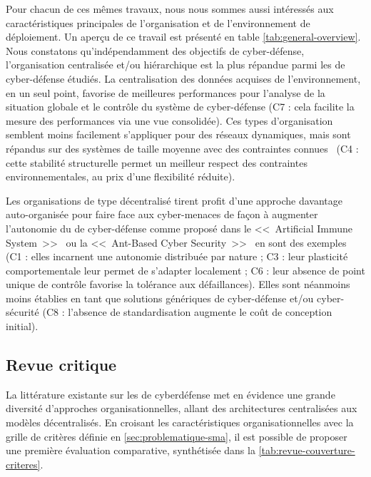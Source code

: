 Pour chacun de ces mêmes travaux, nous nous sommes aussi intéressés aux caractéristiques principales de l’organisation et de l'environnement de déploiement.
Un aperçu de ce travail est présenté en table \ref{tab:general-overview}.
Nous constatons qu'indépendamment des objectifs de cyber-défense, l'organisation centralisée et/ou hiérarchique est la plus répandue parmi les  de cyber-défense étudiés.
La centralisation des données acquises de l'environnement, en un seul point, favorise de meilleures performances pour l'analyse de la situation globale et le contrôle du système de cyber-défense (C7 : cela facilite la mesure des performances via une vue consolidée).
Ces types d'organisation semblent moins facilement s'appliquer pour des réseaux dynamiques, mais sont répandus sur des systèmes de taille moyenne avec des contraintes connues~\cite{vasilomanolakis2015taxonomy} (C4 : cette stabilité structurelle permet un meilleur respect des contraintes environnementales, au prix d’une flexibilité réduite).

Les organisations de type décentralisé tirent profit d'une approche davantage auto-organisée pour faire face aux cyber-menaces de façon à augmenter l'autonomie du  de cyber-défense comme proposé dans le <<~Artificial Immune System~>>~\cite{morteza2015method} ou la <<~Ant-Based Cyber Security~>>~\cite{haack2011ant} en sont des exemples (C1 : elles incarnent une autonomie distribuée par nature ; C3 : leur plasticité comportementale leur permet de s’adapter localement ; C6 : leur absence de point unique de contrôle favorise la tolérance aux défaillances).
Elles sont néanmoins moins établies en tant que solutions génériques de cyber-défense et/ou cyber-sécurité (C8 : l’absence de standardisation augmente le coût de conception initial).

\subsection{Revue critique}

La littérature existante sur les  de cyberdéfense met en évidence une grande diversité d'approches organisationnelles, allant des architectures centralisées aux modèles décentralisés. En croisant les caractéristiques organisationnelles avec la grille de critères définie en \autoref{sec:problematique-sma}, il est possible de proposer une première évaluation comparative, synthétisée dans la \autoref{tab:revue-couverture-criteres}.

